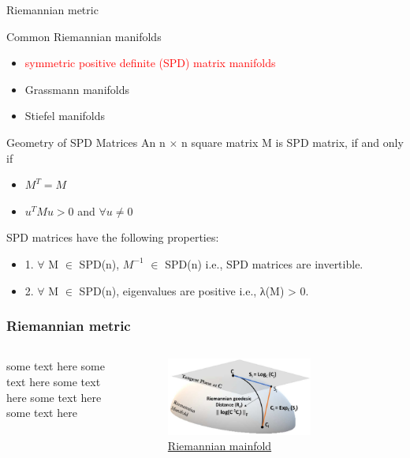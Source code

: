 \documentclass[10pt]{beamer}
\begin{document}
\begin{frame}{Riemannian metric}
    \begin{exampleblock}{Common Riemannian manifolds}
	\begin{itemize}
    \item \textcolor{red}{symmetric positive definite (SPD) matrix manifolds}
    \item Grassmann manifolds
    \item Stiefel manifolds
    \end{itemize}
    \end{exampleblock}
\end{frame}


\begin{frame}{Geometry of SPD Matrices}
An n $\times$ n square matrix M is SPD matrix, if and only if
\begin{itemize}
    \item $M^T = M$
    \item $u^TMu>0$ and $\forall u \neq 0$
\end{itemize}
SPD matrices have the following properties:
\begin{itemize}
\item 1. $\forall$ M $\in$ SPD(n), $M^{-1}$ $\in$ SPD(n) i.e., SPD matrices are invertible. 
\item 2. $\forall$ M $\in$ SPD(n), eigenvalues are positive i.e., λ(M) > 0.
\end{itemize}
\end{frame}

\begin{frame}
    \frametitle{Riemannian metric}
    \begin{columns}
        \begin{column}{0.3\textwidth}
           some text here some text here some text here some text here some text here
        \end{column}
        \begin{column}{0.7\textwidth}  %
            \begin{figure}[!htb] 
                \centering 
                \includegraphics[width=0.7\textwidth]{RieDis.png}
                \caption{\href{https://www.mdpi.com/1424-8220/19/2/379}{Riemannian mainfold}} 
            \end{figure}
        \end{column}
    \end{columns}
\end{frame}
\end{document}
